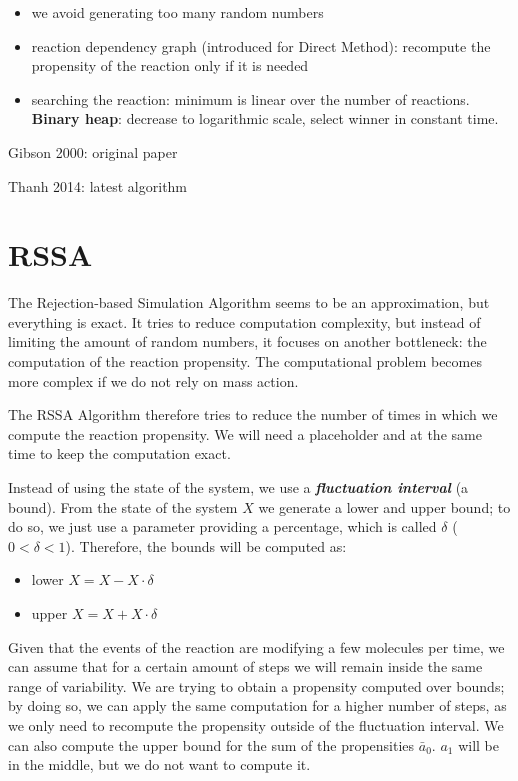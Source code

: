 \begin{itemize}
\tightlist
\item
  we avoid generating too many random numbers
\item
  reaction dependency graph (introduced for Direct Method): recompute
  the propensity of the reaction only if it is needed
\item
  searching the reaction: minimum is linear over the number of
  reactions. \textbf{Binary heap}: decrease to logarithmic scale, select
  winner in constant time.
\end{itemize}

Gibson 2000: original paper

Thanh 2014: latest algorithm

\hypertarget{rssa}{%
\section{RSSA}\label{rssa}}

The Rejection-based Simulation Algorithm seems to be an approximation,
but everything is exact. It tries to reduce computation complexity, but
instead of limiting the amount of random numbers, it focuses on another
bottleneck: the computation of the reaction propensity. The
computational problem becomes more complex if we do not rely on mass
action.

The RSSA Algorithm therefore tries to reduce the number of times in
which we compute the reaction propensity. We will need a placeholder and
at the same time to keep the computation exact.

Instead of using the state of the system, we use a
\textbf{\emph{fluctuation interval}} (a bound). From the state of the
system $X$ we generate a lower and upper bound; to do so, we just use a
parameter providing a percentage, which is called $\delta$
($0<\delta<1$). Therefore, the bounds will be computed as:

\begin{itemize}
\tightlist
\item
  lower $X = X - X \cdot \delta$
\item
  upper $X = X + X \cdot \delta$
\end{itemize}

Given that the events of the reaction are modifying a few molecules per
time, we can assume that for a certain amount of steps we will remain
inside the same range of variability. We are trying to obtain a
propensity computed over bounds; by doing so, we can apply the same
computation for a higher number of steps, as we only need to recompute
the propensity outside of the fluctuation interval. We can also compute
the upper bound for the sum of the propensities $\bar{a}_0$. $a_1$ will
be in the middle, but we do not want to compute it.

